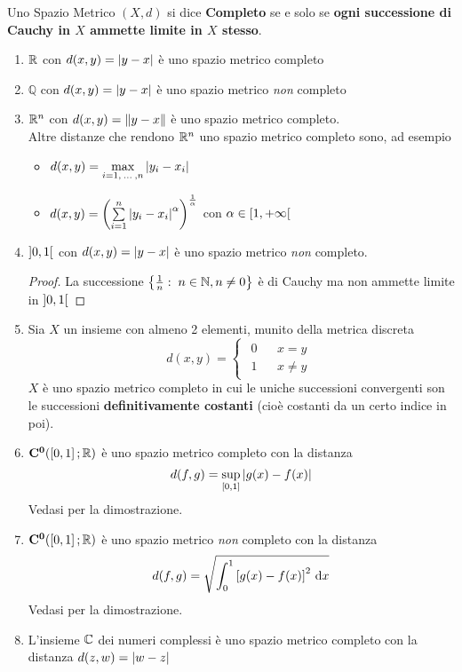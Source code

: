 \begin{definition}
	\label{def:completo}
	Uno Spazio Metrico $(X,d)$ si dice \textbf{Completo} se e solo se \textbf{ogni successione di Cauchy in $X$ ammette limite in $X$ stesso}.
\end{definition}
\begin{example}\leavevmode\vspace*{-\baselineskip}
	\begin{enumerate}
		\item $\mathbb{R}$ con $d(x,y) = \left|y - x\right|$ è uno spazio metrico completo
		\item $\mathbb{Q}$ con $d(x,y) = \left|y - x\right|$ è uno spazio metrico \textit{non} completo
		\item $\mathbb{R}^n$ con $d(x,y) = \left\|y - x\right\|$ è uno spazio metrico completo.\\
			Altre distanze che rendono $\mathbb{R}^n$ uno spazio metrico completo sono, ad esempio
			\begin{itemize}
				\item $d(x,y) = \max\limits_{i=1,\:\dotsc\:,n} \left|y_i - x_i\right|$
				\item $d(x,y) = \left( \sum\limits_{i=1}^{n} \left|y_i - x_i\right|^\alpha \right)^{\frac{1}{\alpha}}$ con $\alpha \in \left[1,+\infty\right[$
			\end{itemize}
		\item $\left]0,1\right[$ con $d(x,y) = \left|y - x\right|$ è uno spazio metrico \textit{non} completo.
			\begin{proof}
				La successione $\left\{\frac{1}{n}:\; n \in \mathbb{N}, n \neq 0\right\}$ è di Cauchy ma non ammette limite in $\left]0,1\right[$
			\end{proof}
		\item Sia $X$ un insieme con almeno 2 elementi, munito della metrica discreta
			$$d(x,y)=
			\begin{cases}
				\begin{matrix}
					0&&x=y\\
					1&&x \ne y
				\end{matrix}
			\end{cases}$$
			$X$ è uno spazio metrico completo in cui le uniche successioni convergenti son le successioni \textbf{definitivamente costanti} (cioè costanti da un certo indice in poi).
		\item $\mathbf{C^{0}}(\left[0,1\right]; \mathbb{R})$ è uno spazio metrico completo con la distanza
			$$d(f,g) = \sup\limits_{\left[0,1\right]}\left|g(x) - f(x)\right|$$
			Vedasi  per la dimostrazione.
		\item $\mathbf{C^{0}}(\left[0,1\right]; \mathbb{R})$ è uno spazio metrico \textit{non} completo con la distanza
			$$d(f,g) = \sqrt{\int_0^1 \left[ g(x) - f(x) \right]^2 \,\mathrm{d}{x}}$$
			Vedasi  per la dimostrazione.
		\item L'insieme $\mathbb{C}$ dei numeri complessi è uno spazio metrico completo con la distanza $d(z,w) = \left|w-z\right|$
	\end{enumerate}
\end{example}
